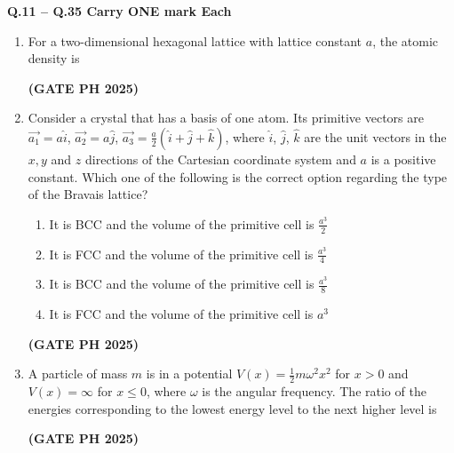 \documentclass[14pt, a4paper]{extarticle}
\renewcommand{\vec}[1]{\overrightarrow{#1}}
\begin{document}
\textbf{Q.11 – Q.35 Carry ONE mark Each}

\begin{enumerate}[label=\textbf{Q.\arabic*}]

\item For a two-dimensional hexagonal lattice with lattice constant $a$, the atomic density is
\begin{enumerate}
\end{enumerate}
\hfill \textbf{(GATE PH 2025)}

\item Consider a crystal that has a basis of one atom. Its primitive vectors are $\vec{a_1} = a\hat{i}$, $\vec{a_2} = a\hat{j}$, $\vec{a_3} = \frac{a}{2}(\hat{i} + \hat{j} + \hat{k})$, where $\hat{i}$, $\hat{j}$, $\hat{k}$ are the unit vectors in the $x, y$ and $z$ directions of the Cartesian coordinate system and $a$ is a positive constant. Which one of the following is the correct option regarding the type of the Bravais lattice?
\begin{enumerate}
\item It is BCC and the volume of the primitive cell is $\frac{a^3}{2}$
\item It is FCC and the volume of the primitive cell is $\frac{a^3}{4}$
\item It is BCC and the volume of the primitive cell is $\frac{a^3}{8}$
\item It is FCC and the volume of the primitive cell is $a^3$
\end{enumerate}
\hfill \textbf{(GATE PH 2025)}

\item A particle of mass $m$ is in a potential $V(x) = \frac{1}{2}m\omega^2x^2$ for $x > 0$ and $V(x) = \infty$ for $x \le 0$, where $\omega$ is the angular frequency. The ratio of the energies corresponding to the lowest energy level to the next higher level is
\begin{enumerate}
\end{enumerate}
\hfill \textbf{(GATE PH 2025)}


\end{enumerate}
\end{document}
